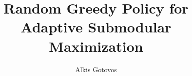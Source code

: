 \documentclass[a4paper,11pt]{article}
\begin{document}
\title{Random Greedy Policy for Adaptive Submodular Maximization}
\author{Alkis Gotovos}
\maketitle





\end{document}
